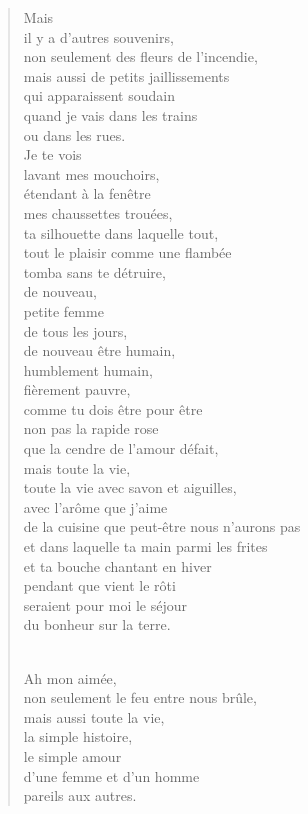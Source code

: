 \documentclass[11pt,a4paper]{book}
\begin{document}
\begin{verse}
Mais \\
il y a d'autres souvenirs, \\
non seulement des fleurs de l'incendie, \\
mais aussi de petits jaillissements \\
qui apparaissent soudain \\
quand je vais dans les trains \\
ou dans les rues. \\
Je te vois \\
lavant mes mouchoirs, \\
étendant à la fenêtre \\
mes chaussettes trouées, \\
ta silhouette dans laquelle tout, \\
tout le plaisir comme une flambée \\
tomba sans te détruire, \\
de nouveau, \\
petite femme \\
de tous les jours, \\
de nouveau être humain, \\
humblement humain, \\
fièrement pauvre, \\
comme tu dois être pour être \\
non pas la rapide rose \\
que la cendre de l'amour défait, \\
mais toute la vie, \\
toute la vie avec savon et aiguilles, \\
avec l'arôme que j'aime \\
de la cuisine que peut-être nous n'aurons pas \\
et dans laquelle ta main parmi les frites \\
et ta bouche chantant en hiver \\
pendant que vient le rôti \\
seraient pour moi le séjour \\
du bonheur sur la terre. \\ \

Ah mon aimée, \\
non seulement le feu entre nous brûle, \\
mais aussi toute la vie, \\
la simple histoire, \\
le simple amour \\
d'une femme et d'un homme \\
pareils aux autres.
\end{verse}
\end{document}
